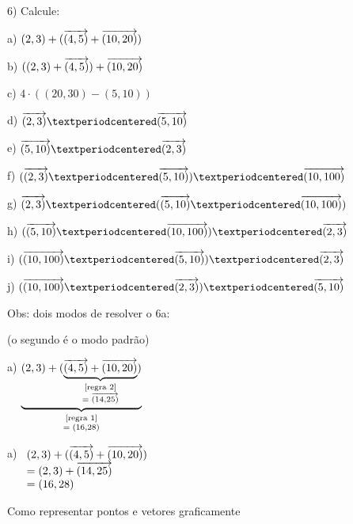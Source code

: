 \documentclass[oneside]{book}
\begin{document}
6) Calcule:

\begin{minipage}[t]{2.25in}

a) $(2,3)+(\V(4,5)+\V(10,20))$

b) $((2,3)+\V(4,5))+\V(10,20)$

c) $4·((20,30)-(5,10))$

d) $\V(2,3)·\V(5,10)$

e) $\V(5,10)·\V(2,3)$

f) $(\V(2,3)·\V(5,10))·\V(10,100)$

g) $\V(2,3)·(\V(5,10)·\V(10,100))$

h) $(\V(5,10)·\V(10,100))·\V(2,3)$

i) $(\V(10,100)·\V(5,10))·\V(2,3)$

j) $(\V(10,100)·\V(2,3))·\V(5,10)$

\end{minipage}
%
\begin{minipage}[t]{2in}

Obs: dois modos de resolver o 6a:

(o segundo é o modo padrão)

\msk

a)
$\unds {(2,3)+(\unds {\V(4,5)+\V(10,20)}
                     2
                     {=\;\V(14,25)}     )}
       1
       {=\;(16,28)}
$

\msk

a) $\begin{array}[t]{l}
      (2,3)+(\V(4,5)+\V(10,20)) \\
    = (2,3)+\V(14,25) \\
    = (16,28) \\
    \end{array}
   $

\end{minipage}


\newpage

%

 {Como representar pontos e vetores graficamente}
\end{document}
